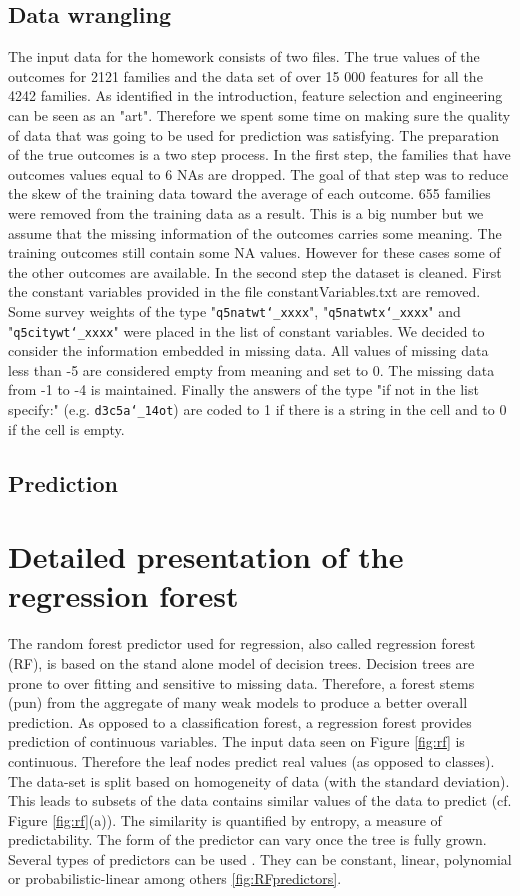 \documentclass{article} %
\begin{document}
\subsection{Data wrangling}
The input data for the homework consists of two files. The true values of the outcomes for 2121 families and the data set of over 15 000 features for all the 4242 families. As identified in the introduction, feature selection and engineering can be seen as an "art". Therefore we spent some time on making sure the quality of data that was going to be used for prediction was satisfying. 
The preparation of the true outcomes is a two step process. In the first step, the families that have outcomes values equal to 6 NAs are dropped. The goal of that step was to reduce the skew of the training data toward the average of each outcome. 655 families were removed from the training data as a result. This is a big number but we assume that the missing information of the outcomes carries some meaning. The training outcomes still contain some NA values. However for these cases some of the other outcomes are available. In the second step the dataset is cleaned. First the constant variables provided in the file {\selectfont constantVariables.txt} are removed. Some survey weights of the type "\texttt{q5natwt\char`_xxxx}", "\texttt{q5natwtx\char`_xxxx}" and "\texttt{q5citywt\char`_xxxx}" were placed in the list of constant variables. We decided to consider the information embedded in missing data. All values of missing data less than -5 are considered empty from meaning and set to 0. The missing data from -1 to -4 is maintained. Finally the answers of the type "if not in the list specify:" (e.g. \texttt{d3c5a\char`_14ot}) are coded to 1 if there is a string in the cell and to 0 if the cell is empty.
\subsection{Prediction}
\section{Detailed presentation of the regression forest}
The random forest predictor used for regression, also called regression forest (RF), is based on the stand alone model of decision trees. Decision trees are prone to over fitting and sensitive to missing data. Therefore, a forest stems (pun) from the aggregate of many weak models to produce a better overall prediction. As opposed to a classification forest, a regression forest provides prediction of continuous variables. The input data seen on Figure \ref{fig:rf} is continuous. Therefore the leaf nodes predict real values (as opposed to classes). The data-set is split based on homogeneity of data (with the standard deviation). This leads to subsets of the data contains similar values of the data to predict (cf. Figure \ref{fig:rf}(a)). The similarity is quantified by entropy, a measure of predictability. The form of the predictor can vary once the tree is fully grown. Several types of predictors can be used \cite{criminisi2011decision}. They can be constant, linear, polynomial or probabilistic-linear among others  \ref{fig:RFpredictors}.
\end{document}
